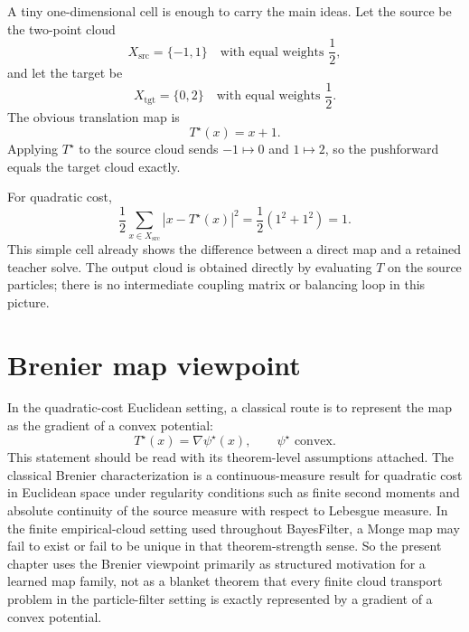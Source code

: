 A tiny one-dimensional cell is enough to carry the main ideas.  Let the source be
the two-point cloud
\[
  X_{\mathrm{src}}=\{-1,1\}
  \quad\text{with equal weights }\frac{1}{2},
\]
and let the target be
\[
  X_{\mathrm{tgt}}=\{0,2\}
  \quad\text{with equal weights }\frac{1}{2}.
\]
The obvious translation map is
\begin{equation}
\label{eq:bf-neural-ot-direct-shift-map}
  T^\star(x)=x+1.
\end{equation}
Applying \(T^\star\) to the source cloud sends \(-1\mapsto 0\) and
\(1\mapsto 2\), so the pushforward equals the target cloud exactly.

For quadratic cost,
\begin{equation}
\label{eq:bf-neural-ot-direct-shift-cost}
  \frac{1}{2}\sum_{x\in X_{\mathrm{src}}}|x-T^\star(x)|^2
  =
  \frac{1}{2}(1^2+1^2)=1.
\end{equation}
This simple cell already shows the difference between a direct map and a retained
teacher solve.  The output cloud is obtained directly by evaluating \(T\) on the
source particles; there is no intermediate coupling matrix or balancing loop in
this picture.

\section{Brenier map viewpoint}
\label{sec:bf-neural-ot-direct-brenier}

In the quadratic-cost Euclidean setting, a classical route is to represent the map
as the gradient of a convex potential:
\begin{equation}
\label{eq:bf-neural-ot-direct-brenier}
  T^\star(x)=\nabla\psi^\star(x),
  \qquad
  \psi^\star\text{ convex}.
\end{equation}
This statement should be read with its theorem-level assumptions attached.  The
classical Brenier characterization is a continuous-measure result for quadratic
cost in Euclidean space under regularity conditions such as finite second
moments and absolute continuity of the source measure with respect to Lebesgue
measure.  In the finite empirical-cloud setting used throughout BayesFilter, a
Monge map may fail to exist or fail to be unique in that theorem-strength sense.
So the present chapter uses the Brenier viewpoint primarily as structured
motivation for a learned map family, not as a blanket theorem that every finite
cloud transport problem in the particle-filter setting is exactly represented by a
gradient of a convex potential.

